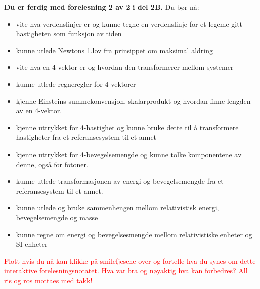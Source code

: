 \documentclass{beamer}
\let\hrefori\href
\renewcommand{\href}[2]{{\setlength{\fboxsep}{1pt}\colorbox{sunset}{\hrefori{#1}{#2}}}}
\newcommand{\pagebutton}[1]{\setbeamertemplate{button}{\tikz\node[inner xsep = 5pt, draw = structure!90, fill = green(ryb), rounded corners = 8pt]{\color{amber}\Large\insertbuttontext};}\beamerbutton{#1}}
\begin{document}
\begin{frame}
\label{oppsummering}
\hyperlink{pe20}{\pagebutton{\small Forrige side}}\href{https://nettskjema.no/a/171403}{ \Changey[1][yellow]{-2}}
{\footnotesize
{\bf Du er ferdig med forelesning 2 av 2 i del 2B.} Du bør nå:
\begin{itemize}
\item vite hva verdenslinjer er og kunne tegne en verdenslinje for et legeme gitt hastigheten som funksjon av tiden
\item kunne utlede Newtons 1.lov fra prinsippet om maksimal aldring
\item vite hva en 4-vektor er og hvordan den transformerer mellom systemer
\item kunne utlede regneregler for 4-vektorer
\item kjenne Einsteins summekonvensjon, skalarprodukt og hvordan finne lengden av en 4-vektor.
\item kjenne uttrykket for 4-hastighet og kunne bruke dette til å transformere hastigheter fra et referansesystem til et annet
\item kjenne uttrykket for 4-bevegelsemengde og kunne tolke komponentene av denne, også for fotoner.
\item kunne utlede transformasjonen av energi og bevegelsemengde fra et referansesystem til et annet.
\item kunne utlede og bruke sammenhengen mellom relativistisk energi, bevegelsemengde og masse
\item kunne regne om energi og bevegelsesmengde mellom relativistiske enheter og SI-enheter
\end{itemize}
\textcolor{red}{Flott hvis du nå kan klikke på smilefjesene over og fortelle hva du synes om dette interaktive forelesningsnotatet. Hva var bra og nøyaktig hva kan forbedres? All ris og ros mottaes med takk!}
}
\end{frame}
\end{document}
